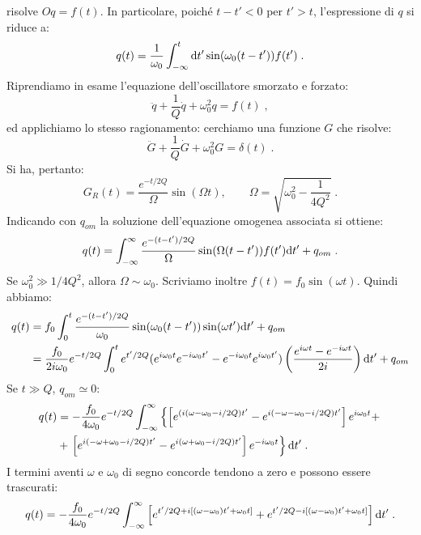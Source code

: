 risolve $Oq=f(t)$. In particolare, poiché $t-t'<0$ per $t'>t$, l'espressione di $q$ si riduce a:
\begin{equation}
q(t)=\frac{1}{\omega_0}\int_{-\infty}^t\diff[t']\sin(\omega_0(t-t'))f(t')\;.
\end{equation}
Riprendiamo in esame l'equazione dell'oscillatore smorzato e forzato:
\begin{equation}
\ddot{q}+\frac{1}{Q}\dot{q}+\omega_0^2q=f(t)\;,
\end{equation}
ed applichiamo lo stesso ragionamento: cerchiamo una funzione $G$ che risolve:
\begin{equation}
\ddot{G}+\frac{1}{Q}\dot{G}+\omega_0^2G=\delta(t)\;.
\end{equation}
Si ha, pertanto:
\begin{equation}
G_R(t)=\frac{e^{-t/2Q}}{\Omega}\sin(\Omega t),\qquad \Omega=\sqrt{\omega_0^2-\frac{1}{4Q^2}}\;.
\end{equation}
Indicando con $q_{om}$ la soluzione dell'equazione omogenea associata si ottiene:
\begin{equation}
q(t)=\int_{-\infty}^{\infty}\frac{e^{-(t-t')/2Q}}{\Omega}\sin(\Omega(t-t'))f(t')\diff[t']+q_{om}\;.
\end{equation}
Se $\omega_0^2\gg 1/4Q^2$, allora $\Omega \sim \omega_0$. Scriviamo inoltre $f(t)=f_0\sin(\omega t)$. Quindi abbiamo:
\begin{align}
q(t) &= f_0\int_0^t\frac{e^{-(t-t')/2Q}}{\omega_0}\sin(\omega_0(t-t'))\sin(\omega t')\diff{t'}+q_{om} \notag \\
&=\frac{f_0}{2i\omega_0}e^{-t/2Q}\int_0^te^{t'/2Q}(e^{i\omega_0t}e^{-i\omega_0t'}-e^{-i\omega_0t}e^{i\omega_0t'})\left(\frac{e^{i\omega t}-e^{-i\omega t}}{2i}\right)\diff{t'}+q_{om}
\end{align}
Se $t\gg Q$, $q_{om}\simeq 0$:
\begin{align}
q(t) &= -\frac{f_0}{4\omega_0}e^{-t/2Q}\int_{-\infty}^{\infty}\left\{\left[e^{(i(\omega-\omega_0-i/2Q)t'}-e^{i(-\omega-\omega_0-i/2Q)t'}\right]e^{i\omega_0t}+\right. \notag \\
&+\left.\left[e^{i(-\omega+\omega_0-i/2Q)t'}-e^{i(\omega+\omega_0-i/2Q)t'}\right]e^{-i\omega_0t}\right\}\diff{t'}\;.
\end{align}
I termini aventi $\omega$ e $\omega_0$ di segno concorde tendono a zero e possono essere trascurati:
\begin{equation}
q(t)=-\frac{f_0}{4\omega_0}e^{-t/2Q}\int_{-\infty}^{\infty}\left[e^{t'/2Q+i[(\omega-\omega_0)t'+\omega_0t]}+e^{t'/2Q-i[(\omega-\omega_0)t'+\omega_0t]}\right]\diff{t'}\;.
\end{equation}
